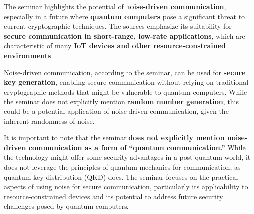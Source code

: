 \documentclass[
]{article}
\begin{document}
\begin{enumerate}
  The seminar highlights the potential of \textbf{noise-driven
  communication}, especially in a future where \textbf{quantum
  computers} pose a significant threat to current cryptographic
  techniques. The sources emphasize its suitability for \textbf{secure
  communication in short-range, low-rate applications}, which are
  characteristic of many \textbf{IoT devices and other
  resource-constrained environments}.

  Noise-driven communication, according to the seminar, can be used for
  \textbf{secure key generation}, enabling secure communication without
  relying on traditional cryptographic methods that might be vulnerable
  to quantum computers. While the seminar does not explicitly mention
  \textbf{random number generation}, this could be a potential
  application of noise-driven communication, given the inherent
  randomness of noise.

  It is important to note that the seminar \textbf{does not explicitly
  mention noise-driven communication as a form of ``quantum
  communication.''} While the technology might offer some security
  advantages in a post-quantum world, it does not leverage the
  principles of quantum mechanics for communication, as quantum key
  distribution (QKD) does. The seminar focuses on the practical aspects
  of using noise for secure communication, particularly its
  applicability to resource-constrained devices and its potential to
  address future security challenges posed by quantum computers.
\end{enumerate}
\end{document}
